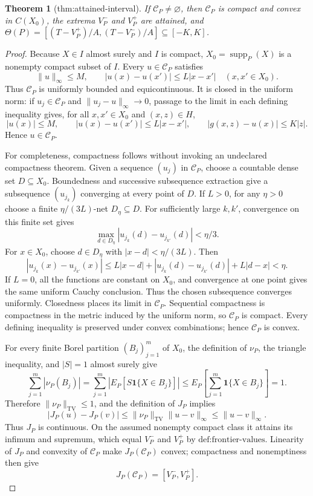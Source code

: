 \documentclass{article}
\newtheorem{theorem}{Theorem}
\begin{document}
\begin{theorem}[thm:attained-interval]\label{thm:attained-interval}
If \(\mathcal C_P\neq\varnothing\), then \(\mathcal C_P\) is compact and convex in \(C(X_0)\), the extrema \(V_P^-\) and \(V_P^+\) are attained, and \(\Theta(P)=[(T-V_P^+)/A,(T-V_P^-)/A]\subseteq[-K,K]\).
\end{theorem}
\begin{proof}
Because \(X\in I\) almost surely and \(I\) is compact, \(X_0=\operatorname{supp}_P(X)\) is a nonempty compact subset of \(I\).  Every \(u\in\mathcal C_P\) satisfies
\[
 \|u\|_\infty\leq M,
 \qquad
 |u(x)-u(x')|\leq L|x-x'|
 \quad(x,x'\in X_0).
\]
Thus \(\mathcal C_P\) is uniformly bounded and equicontinuous.  It is closed in the uniform norm: if \(u_j\in\mathcal C_P\) and \(\|u_j-u\|_\infty\to0\), passage to the limit in each defining inequality gives, for all \(x,x'\in X_0\) and \((x,z)\in H\),
\[
 |u(x)|\leq M,
 \qquad
 |u(x)-u(x')|\leq L|x-x'|,
 \qquad
 |g(x,z)-u(x)|\leq K|z|.
\]
Hence \(u\in\mathcal C_P\).

For completeness, compactness follows without invoking an undeclared compactness theorem.  Given a sequence \((u_j)\) in \(\mathcal C_P\), choose a countable dense set \(D\subseteq X_0\).  Boundedness and successive subsequence extraction give a subsequence \((u_{j_k})\) converging at every point of \(D\).  If \(L>0\), for any \(\eta>0\) choose a finite \(\eta/(3L)\)-net \(D_\eta\subseteq D\).  For sufficiently large \(k,k'\), convergence on this finite set gives
\[
 \max_{d\in D_\eta}|u_{j_k}(d)-u_{j_{k'}}(d)|<\eta/3.
\]
For \(x\in X_0\), choose \(d\in D_\eta\) with \(|x-d|<\eta/(3L)\).  Then
\[
 |u_{j_k}(x)-u_{j_{k'}}(x)|
 \leq L|x-d|+|u_{j_k}(d)-u_{j_{k'}}(d)|+L|d-x|<\eta.
\]
If \(L=0\), all the functions are constant on \(X_0\), and convergence at one point gives the same uniform Cauchy conclusion.  Thus the chosen subsequence converges uniformly.  Closedness places its limit in \(\mathcal C_P\).  Sequential compactness is compactness in the metric induced by the uniform norm, so \(\mathcal C_P\) is compact.  Every defining inequality is preserved under convex combinations; hence \(\mathcal C_P\) is convex.

For every finite Borel partition \((B_j)_{j=1}^m\) of \(X_0\), the definition of \(\nu_P\), the triangle inequality, and \(|S|=1\) almost surely give
\[
 \sum_{j=1}^m|\nu_P(B_j)|
 =\sum_{j=1}^m\left|E_P[S\mathbf 1\{X\in B_j\}]\right|
 \leq E_P\!\left[\sum_{j=1}^m\mathbf 1\{X\in B_j\}\right]=1.
\]
Therefore \(\|\nu_P\|_{\mathrm{TV}}\leq1\), and the definition of \(J_P\) implies
\[
 |J_P(u)-J_P(v)|
 \leq \|\nu_P\|_{\mathrm{TV}}\|u-v\|_\infty
 \leq\|u-v\|_\infty.
\]
Thus \(J_P\) is continuous.  On the assumed nonempty compact class it attains its infimum and supremum, which equal \(V_P^-\) and \(V_P^+\) by \(\text{def:frontier-values}\).  Linearity of \(J_P\) and convexity of \(\mathcal C_P\) make \(J_P(\mathcal C_P)\) convex; compactness and nonemptiness then give
\[
 J_P(\mathcal C_P)=[V_P^-,V_P^+].
\]


\end{proof}
\end{document}
